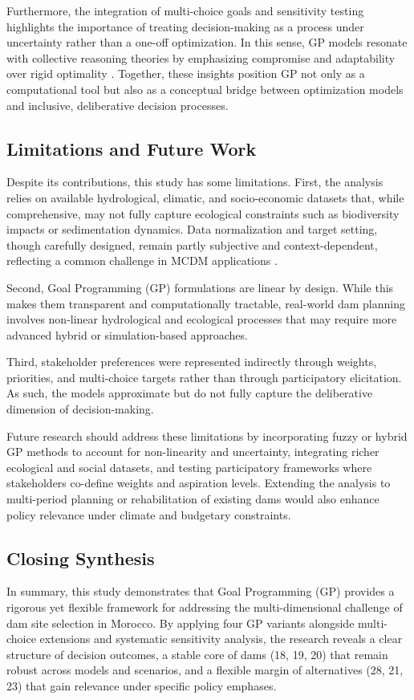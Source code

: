 Furthermore, the integration of multi-choice goals and sensitivity testing highlights the importance of treating decision-making as a process under uncertainty rather than a one-off optimization. In this sense, GP models resonate with collective reasoning theories by emphasizing compromise and adaptability over rigid optimality \cite{Borges2020}. Together, these insights position GP not only as a computational tool but also as a conceptual bridge between optimization models and inclusive, deliberative decision processes.

\subsection{Limitations and Future Work}
Despite its contributions, this study has some limitations.  
First, the analysis relies on available hydrological, climatic, and socio-economic datasets that, while comprehensive, may not fully capture ecological constraints such as biodiversity impacts or sedimentation dynamics. Data normalization and target setting, though carefully designed, remain partly subjective and context-dependent, reflecting a common challenge in MCDM applications \cite{Belton2002,Mardani2015}.  

Second, Goal Programming (GP) formulations are linear by design. While this makes them transparent and computationally tractable, real-world dam planning involves non-linear hydrological and ecological processes that may require more advanced hybrid or simulation-based approaches.  

Third, stakeholder preferences were represented indirectly through weights, priorities, and multi-choice targets rather than through participatory elicitation. As such, the models approximate but do not fully capture the deliberative dimension of decision-making.  

Future research should address these limitations by incorporating fuzzy or hybrid GP methods to account for non-linearity and uncertainty, integrating richer ecological and social datasets, and testing participatory frameworks where stakeholders co-define weights and aspiration levels. Extending the analysis to multi-period planning or rehabilitation of existing dams would also enhance policy relevance under climate and budgetary constraints.

\subsection{Closing Synthesis}
In summary, this study demonstrates that Goal Programming (GP) provides a rigorous yet flexible framework for addressing the multi-dimensional challenge of dam site selection in Morocco. By applying four GP variants alongside multi-choice extensions and systematic sensitivity analysis, the research reveals a clear structure of decision outcomes, a stable core of dams (18, 19, 20) that remain robust across models and scenarios, and a flexible margin of alternatives (28, 21, 23) that gain relevance under specific policy emphases.  

